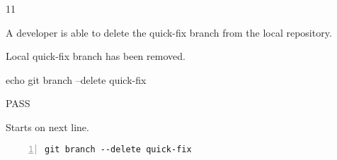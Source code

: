 \begin{description}[align=right,leftmargin=3.2cm,labelindent=3.0cm]
\item[Step:] 11
\item[Confirm:] A developer is able to delete the quick-fix branch from the local repository.
\item[Expectation:] Local quick-fix branch has been removed.
\item[Command:] echo git  branch --delete quick-fix
\item[Test Result:] PASS
\item[Evidence:] Starts on next line.
\end{description}
\begin{lstlisting}[numbers=left]
git branch --delete quick-fix

\end{lstlisting}
